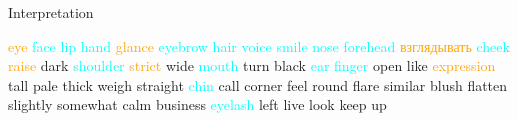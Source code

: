 \documentclass[svgnames]{beamer}
\begin{document}
    \begin{frame}{Interpretation}

\bigskip

\textcolor<2>{orange}{eye} \textcolor<3>{cyan}{face lip hand} \textcolor<2>{orange}{glance} \textcolor<3>{cyan}{eyebrow hair voice smile nose forehead}
\textcolor<2>{orange}{взглядывать} \textcolor<3>{cyan}{cheek} \textcolor<2>{orange}{raise} dark \textcolor<3>{cyan}{shoulder} \textcolor<2>{orange}{strict} wide \textcolor<3>{cyan}{mouth}
turn black \textcolor<3>{cyan}{ear finger} open like \textcolor<2>{orange}{expression} tall
pale thick weigh straight \textcolor<3>{cyan}{chin} call corner feel
round flare similar blush flatten slightly somewhat
calm business \textcolor<3>{cyan}{eyelash} left live look keep up
\end{frame}
\end{document}
